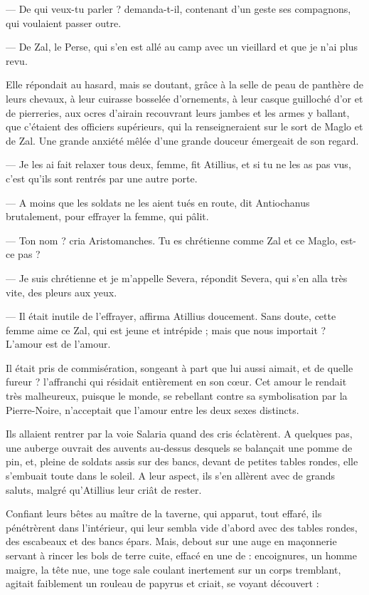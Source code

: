 \documentclass[a4paper, 11pt, oneside, polutonikogreek, french]{article}
\begin{document}
--- De qui veux-tu parler ? demanda-t-il, contenant d'un geste ses compagnons, qui voulaient passer outre.

--- De Zal, le Perse, qui s'en est allé au camp avec un vieillard et que je n'ai plus revu.

Elle répondait au hasard, mais se doutant, grâce à la selle de peau de panthère de leurs chevaux, à leur cuirasse bosselée d'ornements, à leur casque guilloché d'or et de pierreries, aux ocres d'airain recouvrant leurs jambes et les armes y ballant, que c'étaient des officiers supérieurs, qui la renseigneraient sur le sort de Maglo et de Zal. Une grande anxiété mêlée d'une grande douceur émergeait de son regard.

--- Je les ai fait relaxer tous deux, femme, fit Atillius, et si tu ne les as pas vus, c'est qu'ils sont rentrés par une autre porte.

--- A moins que les soldats ne les aient tués en route, dit Antiochanus brutalement, pour effrayer la femme, qui pâlit.

--- Ton nom ? cria Aristomanches. Tu es chrétienne comme Zal et ce Maglo, est-ce pas ?

--- Je suis chrétienne et je m'appelle Severa, répondit Severa, qui s'en alla très vite, des pleurs aux yeux.

--- Il était inutile de l'effrayer, affirma Atillius doucement. Sans doute, cette femme aime ce Zal, qui est jeune et intrépide ; mais que nous importait ? L'amour est de l'amour.

Il était pris de commisération, songeant à part que lui aussi aimait, et de quelle fureur ? l'affranchi qui résidait entièrement en son cœur. Cet amour le rendait très malheureux, puisque le monde, se rebellant contre sa symbolisation par la Pierre-Noire, n'acceptait que l'amour entre les deux sexes distincts.

Ils allaient rentrer par la voie Salaria quand des cris éclatèrent. A quelques pas, une auberge ouvrait des auvents au-dessus desquels se balançait une pomme de pin, et, pleine de soldats assis sur des bancs, devant de petites tables rondes, elle s'embuait toute dans le soleil. A leur aspect, ils s'en allèrent avec de grands saluts, malgré qu'Atillius leur criât de rester.

Confiant leurs bêtes au maître de la taverne, qui apparut, tout effaré, ils pénétrèrent dans l'intérieur, qui leur sembla vide d'abord avec des tables rondes, des escabeaux et des bancs épars. Mais, debout sur une auge en maçonnerie servant à rincer les bols de terre cuite, effacé en une de : encoignures, un homme maigre, la tête nue, une toge sale coulant inertement sur un corps tremblant, agitait faiblement un rouleau de papyrus et criait, se voyant découvert :
\end{document}
